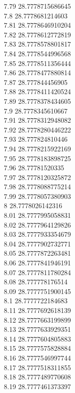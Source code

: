 {7.79	28.7778715686645\\
7.8	28.7778681214603\\
7.81	28.7778646910204\\
7.82	28.7778612772819\\
7.83	28.7778578801817\\
7.84	28.7778544996568\\
7.85	28.7778511356444\\
7.86	28.7778477880814\\
7.87	28.777844456905\\
7.88	28.7778411420524\\
7.89	28.7778378434605\\
7.9	28.7778345610667\\
7.91	28.7778312948082\\
7.92	28.7778280446222\\
7.93	28.777824810446\\
7.94	28.7778215922169\\
7.95	28.7778183898725\\
7.96	28.77781520335\\
7.97	28.7778120325872\\
7.98	28.7778088775214\\
7.99	28.7778057380903\\
8	28.7778026142316\\
8.01	28.7777995058831\\
8.02	28.7777964129826\\
8.03	28.7777933354679\\
8.04	28.7777902732771\\
8.05	28.7777872263481\\
8.06	28.7777841946191\\
8.07	28.7777811780284\\
8.08	28.777778176514\\
8.09	28.7777751900145\\
8.1	28.7777722184683\\
8.11	28.7777692618139\\
8.12	28.7777663199899\\
8.13	28.7777633929351\\
8.14	28.7777604805883\\
8.15	28.7777575828884\\
8.16	28.7777546997744\\
8.17	28.7777518311855\\
8.18	28.7777489770608\\
8.19	28.7777461373397\\
}
